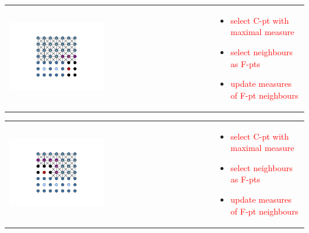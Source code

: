 \documentclass{beamer}
\newcommand{\re}[1]{{\textcolor{red}       {#1}}}
\begin{document}
\begin{frame}



\begin{tabular}{ p{} p{}}

\hspace{5mm} \includegraphics[trim = 85mm 40mm 85mm  40mm, clip, width=0.48\textwidth]{../figures/AMG8.png} &

\vspace{-1.75in}

\begin{itemize}
  \item \re{select C-pt with maximal measure}
  \item \re{select neighbours as F-pts}
  \item \re{update measures of F-pt neighbours}

\end{itemize}

\end{tabular}


\end{frame}


\begin{frame}

\begin{tabular}{ p{} p{}}

\hspace{5mm} \includegraphics[trim = 85mm 40mm 85mm  40mm, clip, width=0.48\textwidth]{../figures/AMG9.png} &

\vspace{-1.75in}

\begin{itemize}
  \item \re{select C-pt with maximal measure}
  \item \re{select neighbours as F-pts}
  \item \re{update measures of F-pt neighbours}

\end{itemize}

\end{tabular}


\end{frame}
\end{document}
